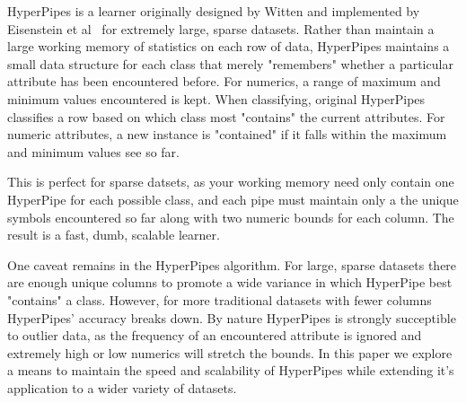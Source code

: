 HyperPipes is a learner originally designed by Witten\cite{Witten99} and implemented by Eisenstein et al~\cite{Eisenstein04} for extremely large, sparse datasets. Rather than maintain a large working memory of statistics on each row of data, HyperPipes maintains a small data structure for each class that merely "remembers" whether a particular attribute has been encountered before. For numerics, a range of maximum and minimum values encountered is kept. When classifying, original HyperPipes classifies a row based on which class most "contains" the current attributes. For numeric attributes, a new instance is "contained" if it falls within the maximum and minimum values see so far.

This is perfect for sparse datsets, as your working memory need only contain one HyperPipe for each possible class, and each pipe must maintain only a the unique symbols encountered so far along with two numeric bounds for each column. The result is a fast, dumb, scalable learner.

One caveat remains in the HyperPipes algorithm. For large, sparse datasets there are enough unique columns to promote a wide variance in which HyperPipe best "contains" a class. However, for more traditional datasets with fewer columns HyperPipes' accuracy breaks down. By nature HyperPipes is strongly succeptible to outlier data, as the frequency of an encountered attribute is ignored and extremely high or low numerics will stretch the bounds. In this paper we explore a means to maintain the speed and scalability of HyperPipes while extending it's application to a wider variety of datasets.
